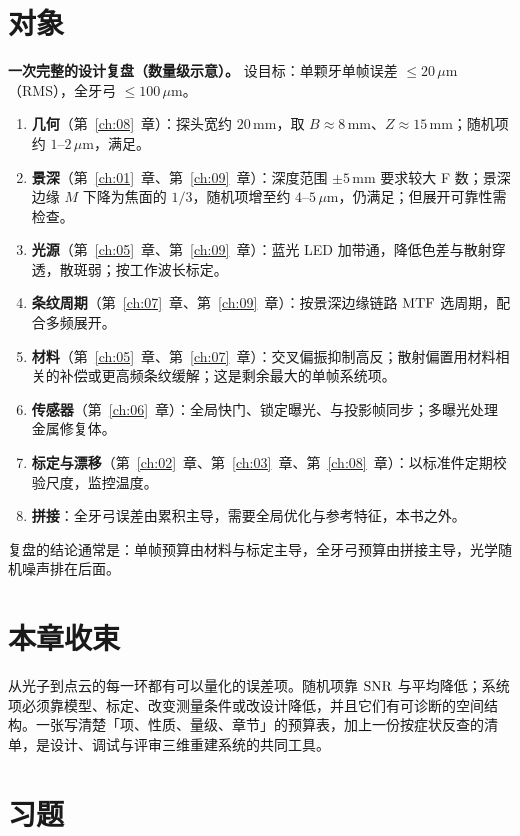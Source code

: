 \section{对象}
\label{sec:ch11-object}

\textbf{一次完整的设计复盘（数量级示意）。} 设目标：单颗牙单帧误差 $\le20\,\mu\mathrm{m}$（RMS），全牙弓 $\le100\,\mu\mathrm{m}$。
\begin{enumerate}
  \item \textbf{几何}（第~\ref{ch:08}~章）：探头宽约 $20\,\mathrm{mm}$，取 $B\approx8\,\mathrm{mm}$、$Z\approx15\,\mathrm{mm}$；随机项约 $1$--$2\,\mu\mathrm{m}$，满足。
  \item \textbf{景深}（第~\ref{ch:01}~章、第~\ref{ch:09}~章）：深度范围 $\pm5\,\mathrm{mm}$ 要求较大 F 数；景深边缘 $M$ 下降为焦面的 $1/3$，随机项增至约 $4$--$5\,\mu\mathrm{m}$，仍满足；但展开可靠性需检查。
  \item \textbf{光源}（第~\ref{ch:05}~章、第~\ref{ch:09}~章）：蓝光 LED 加带通，降低色差与散射穿透，散斑弱；按工作波长标定。
  \item \textbf{条纹周期}（第~\ref{ch:07}~章、第~\ref{ch:09}~章）：按景深边缘链路 $\mathrm{MTF}$ 选周期，配合多频展开。
  \item \textbf{材料}（第~\ref{ch:05}~章、第~\ref{ch:07}~章）：交叉偏振抑制高反；散射偏置用材料相关的补偿或更高频条纹缓解；这是剩余最大的单帧系统项。
  \item \textbf{传感器}（第~\ref{ch:06}~章）：全局快门、锁定曝光、与投影帧同步；多曝光处理金属修复体。
  \item \textbf{标定与漂移}（第~\ref{ch:02}~章、第~\ref{ch:03}~章、第~\ref{ch:08}~章）：以标准件定期校验尺度，监控温度。
  \item \textbf{拼接}：全牙弓误差由累积主导，需要全局优化与参考特征，本书之外。
\end{enumerate}
复盘的结论通常是：单帧预算由材料与标定主导，全牙弓预算由拼接主导，光学随机噪声排在后面。

\section*{本章收束}
从光子到点云的每一环都有可以量化的误差项。随机项靠 $\mathrm{SNR}$ 与平均降低；系统项必须靠模型、标定、改变测量条件或改设计降低，并且它们有可诊断的空间结构。一张写清楚「项、性质、量级、章节」的预算表，加上一份按症状反查的清单，是设计、调试与评审三维重建系统的共同工具。

\section{习题}
\label{sec:ch11-exercises}

